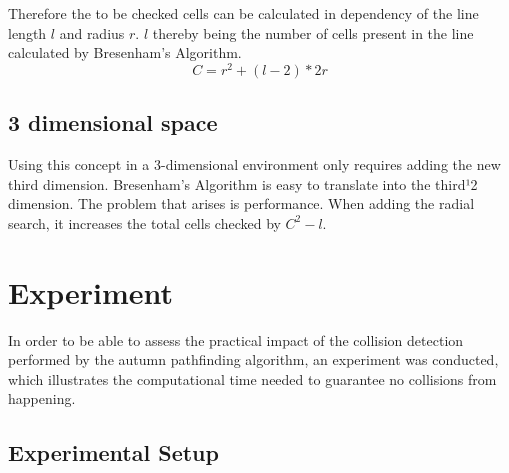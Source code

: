 Therefore the to be checked cells can be calculated in dependency of the line length $l$ and radius $r$. $l$ thereby being the number of cells present in the line calculated by Bresenham's Algorithm. 
\[C=r^2+(l-2)*2r\]

\subsection{3 dimensional space}
Using this concept in a 3-dimensional environment only requires adding the new third dimension. Bresenham's Algorithm is easy to translate into the third¹2 dimension. The problem that arises is performance. When adding the radial search, it increases the total cells checked by \(C^2 - l\).  

\section{Experiment}

In order to be able to assess the practical impact of the collision detection performed by the autumn pathfinding algorithm, an experiment was conducted, which illustrates the computational time needed to guarantee no collisions from happening.

\subsection{Experimental Setup}

